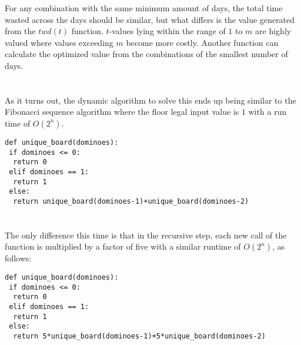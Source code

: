 \documentclass[12pt]{article}
\begin{document}
\noindent For any combination with the same minimum amount of days, the total time wasted across the days should be similar, but what differs is the value generated from the \(twd(t)\) function. \(t\)-values lying within the range of \(1\) to \(m\) are highly valued where values exceeding \(m\) become more costly. Another function can calculate the optimized value from the combinations of the smallest number of days.

\section{}
As it turns out, the dynamic algorithm to solve this ends up being similar to the Fibonacci sequence algorithm where the floor legal input value is \(1\) with a run time of \(O(2^n)\).\newline

\begin{lstlisting}
def unique_board(dominoes):
 if dominoes <= 0:
  return 0
 elif dominoes == 1:
  return 1
 else:
  return unique_board(dominoes-1)+unique_board(dominoes-2)
\end{lstlisting}

\section{}
The only difference this time is that in the recursive step, each new call of the function is multiplied by a factor of five with a similar runtime of \(O(2^n)\), as follows:
\newline

\begin{lstlisting}
def unique_board(dominoes):
 if dominoes <= 0:
  return 0
 elif dominoes == 1:
  return 1
 else:
  return 5*unique_board(dominoes-1)+5*unique_board(dominoes-2)
\end{lstlisting}
\end{document}
